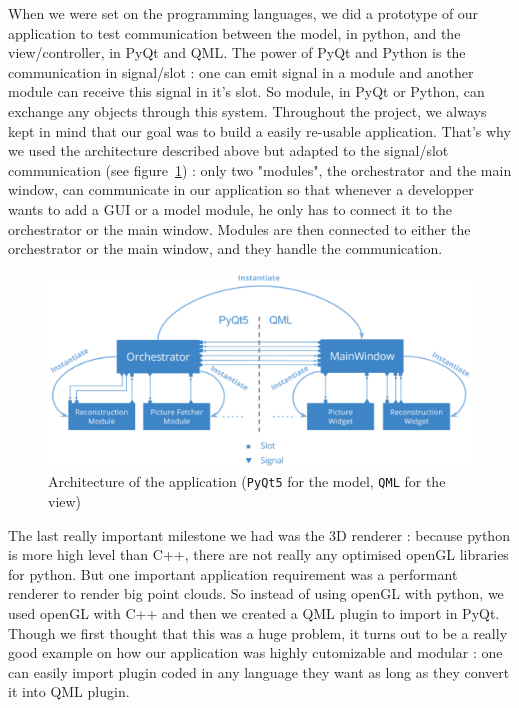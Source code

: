 When we were set on the programming languages, we did a prototype of our application to test communication between the model, in python, and the view/controller, in PyQt and QML. 
The power of PyQt and Python is the communication in signal/slot : one can emit signal in a module and another module can receive this signal in it's slot. So module, in PyQt or Python, 
can exchange any objects through this system. Throughout the project, we always kept in mind that our goal was to build a easily re-usable application. That's why we used the architecture described
above but adapted to the signal/slot communication (see figure~\ref{arch}) : only two "modules", the orchestrator and the main window, can communicate in our application so that whenever a developper wants
to add a GUI or a model module, he only has to connect it to the orchestrator or the main window. Modules are then connected to either the orchestrator or the main window, and they handle the communication. 
\begin{figure}[t]
\includegraphics[width=\linewidth]{images/arch.png}
\caption{Architecture of the application (\texttt{PyQt5} for the model, \texttt{QML} for the view)}
\label{arch}
\vspace{-2mm}
\end{figure}


The last really important milestone we had was the 3D renderer : because python is more high level than C++, there are not really any optimised openGL libraries for python. But one important application requirement
was a performant renderer to render big point clouds. So instead of using openGL with python, we used openGL with C++ and then we created a QML plugin to import in PyQt. Though we first thought that this was a huge 
problem, it turns out to be a really good example on how our application was highly cutomizable and modular : one can easily import plugin coded in any language they want as long as they convert it into QML plugin. 